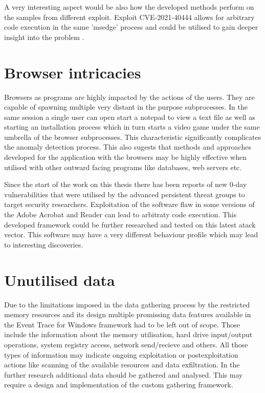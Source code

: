 \documentclass[a4paper,twoside,12pt]{book}
\begin{document}
A very interesting aspect would be also how the developed methods perform on the samples from 
different exploit. Exploit CVE-2021-40444 allows for arbitrary code execution in the same 'msedge'
process and could be utilised to gain deeper insight into the problem \cite{bib:newEdgeExploit}.

\section{Browser intricacies}

Browsers as programs are highly impacted by the actions of the users. They are capable of spawning
multiple very distant in the purpose subprocesses. In the same session a single user can open start
a notepad to view a text file as well as starting an installation process which in turn starts a 
video game under the same umbrella of the browser subprocesses. This characteristic significantly
complicates the anomaly detection process. This also sugests that methods and approaches developed
for the application with the browsers may be highly effective when utilised with other outward 
facing programs like databases, web servers etc.

Since the start of the work on this thesis there has been reports of new 0-day vulnerabilities that were
utilised by the advanced persistent threat groups to target security researchers. Exploitation of the
software flaw in some versions of the Adobe Acrobat and Reader can lead to arbitraty code execution\cite{bib:AdobeExploit}.
This developed framework could be further researched and tested on this latest atack vector. This 
software may have a very different behaviour profile which may lead to interesting discoveries.

\section{Unutilised data}

Due to the limitations imposed in the data gathering process by the restricted memory resources and its
design multiple promissing data features available in the Event Trace for Windows framework had to be
left out of scope. Those include the information about the memory utilisation, hard drive input/output 
operations, system registry access, network send/recieve and others. All those types of information
may indicate ongoing exploitation or postexploitation actions like scanning of the available resources
and data exfiltration. In the further research additional 
data should be gathered and analysed. This may require a design and implementation of the custom  
gathering framework.
\end{document}
